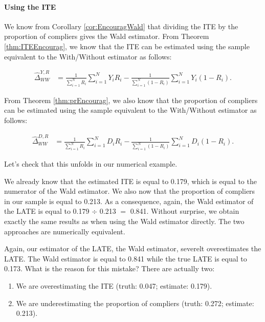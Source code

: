 \documentclass[]{book}
\providecommand{\tightlist}{%
  \setlength{\itemsep}{0pt}\setlength{\parskip}{0pt}}
\let\oldparagraph\paragraph
\renewcommand{\paragraph}[1]{\oldparagraph{#1}\mbox{}}
\theoremstyle{definition}
\theoremstyle{definition}
\theoremstyle{definition}
\theoremstyle{remark}
\let\BeginKnitrBlock\begin \let\EndKnitrBlock\end
\begin{document}
\hypertarget{using-the-ite}{%
\paragraph{Using the ITE}\label{using-the-ite}}

We know from Corollary \ref{cor:EncouragWald} that dividing the ITE by the proportion of compliers gives the Wald estimator.
From Theorem \ref{thm:ITEEncourag}, we know that the ITE can be estimated using the sample equivalent to the With/Without estimator as follows:

\begin{align*}
\hat{\Delta}^{Y,R}_{WW} & = \frac{1}{\sum_{i=1}^N R_i}\sum_{i=1}^N Y_iR_i-\frac{1}{\sum_{i=1}^N (1-R_i)}\sum_{i=1}^N Y_i(1-R_i).
\end{align*}

From Theorem \ref{thm:prEncourag}, we also know that the proportion of compliers can be estimated using the sample equivalent to the With/Without estimator as follows:

\begin{align*}
\hat{\Delta}^{D,R}_{WW} & = \frac{1}{\sum_{i=1}^N R_i}\sum_{i=1}^N D_iR_i-\frac{1}{\sum_{i=1}^N (1-R_i)}\sum_{i=1}^N D_i(1-R_i).
\end{align*}

\BeginKnitrBlock{example}
\protect\hypertarget{exm:unnamed-chunk-122}{}{\label{exm:unnamed-chunk-122} }Let's check that this unfolds in our numerical example.
\EndKnitrBlock{example}

We already know that the estimated ITE is equal to 0.179, which is equal to the numerator of the Wald estimator.
We also now that the proportion of compliers in our sample is equal to 0.213.
As a consequence, again, the Wald estimator of the LATE is equal to 0.179 \(\div\) 0.213 \(=\) 0.841.
Without surprise, we obtain exactly the same results as when using the Wald estimator directly.
The two approaches are numerically equivalent.

Again, our estimator of the LATE, the Wald estimator, severelt overestimates the LATE.
The Wald estimator is equal to 0.841 while the true LATE is equal to 0.173.
What is the reason for this mistake?
There are actually two:

\begin{enumerate}
\def\labelenumi{\arabic{enumi}.}
\tightlist
\item
  We are overestimating the ITE (truth: 0.047; estimate: 0.179).
\item
  We are underestimating the proportion of compliers (truth: 0.272; estimate: 0.213).
\end{enumerate}
\end{document}
